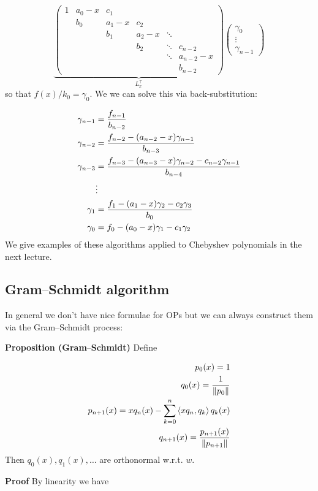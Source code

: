 \documentclass[12pt,landscape]{article}
\def\ip<#1>{\left\langle{#1}\right\rangle}
\def\norm#1{\left\| #1 \right\|}
\def\endash{–}
\begin{document}
{\[
\underbrace{\begin{pmatrix}
1 & a_0-x & c_1 \\
& b_0 & a_1-x & c_2  \\
& & b_1 & a_2-x & \ddots  \\
& &     & b_2 & \ddots & c_{n-2} \\
&&&&\ddots & a_{n-2}-x \\
&&&&& b_{n-2}
\end{pmatrix}}_{L_x^\top} \begin{pmatrix} \gamma_0 \\\vdots\\ \gamma_{n-1} \end{pmatrix}
\]
so that $f(x)/k_0 = \gamma_0$. We we can solve this  via back-substitution:


\begin{align*}
\gamma_{n-1} &= {f_{n-1} \over b_{n-2}} \\
\gamma_{n-2} &= {f_{n-2} - (a_{n-2}-x) \gamma_{n-1} \over b_{n-3}} \\
\gamma_{n-3} &= {f_{n-3} - (a_{n-3}-x) \gamma_{n-2} - c_{n-2} \gamma_{n-1} \over b_{n-4}} \\
& \vdots \\
\gamma_1 &= {f_1 - (a_1-x) \gamma_2 - c_2 \gamma_3 \over b_0} \\
\gamma_0 &= f_0 - (a_0-x) \gamma_1 - c_1 \gamma_2
\end{align*}
We give examples of these algorithms applied to Chebyshev polynomials in the next lecture.

\subsection{Gram\ensuremath{\endash}Schmidt algorithm}
In general we don't have nice formulae for OPs but we can always construct them via the Gram\ensuremath{\endash}Schmidt process:

\textbf{Proposition (Gram\ensuremath{\endash}Schmidt)} Define


\begin{align*}
p_0(x) = 1 \\
q_0(x) = {1 \over \norm{p_0}}\\
p_{n+1}(x) = x q_n(x) - \sum_{k=0}^n \ip<x q_n, q_k> q_k(x)\\
q_{n+1}(x) = {p_{n+1}(x) \over \norm{p_{n+1}}}
\end{align*}
Then $q_0(x), q_1(x), \ldots$ are orthonormal w.r.t. $w$.

\textbf{Proof} By linearity we have

}
\end{document}
